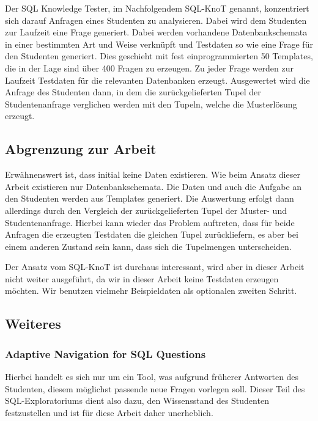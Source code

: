 Der SQL Knowledge Tester, im Nachfolgendem SQL-KnoT genannt, konzentriert sich darauf Anfragen eines Studenten zu analysieren. Dabei wird dem Studenten zur Laufzeit eine Frage generiert. Dabei werden vorhandene Datenbankschemata in einer bestimmten Art und Weise verknüpft und Testdaten so wie eine Frage für den Studenten generiert. Dies geschieht mit fest einprogrammierten 50 Templates, die in der Lage sind über 400 Fragen zu erzeugen. Zu jeder Frage werden zur Laufzeit Testdaten für die relevanten Datenbanken erzeugt. Ausgewertet wird die Anfrage des Studenten dann, in dem die zurückgelieferten Tupel der Studentenanfrage verglichen werden mit den Tupeln, welche die Musterlösung erzeugt. 

\subsection*{Abgrenzung zur Arbeit}

Erwähnenswert ist, dass initial keine Daten existieren. Wie beim Ansatz dieser Arbeit existieren nur Datenbankschemata. Die Daten und auch die Aufgabe an den Studenten werden aus Templates generiert. Die Auswertung erfolgt dann allerdings durch den Vergleich der zurückgelieferten Tupel der Muster- und Studentenanfrage. Hierbei kann wieder das Problem auftreten, dass für beide Anfragen die erzeugten Testdaten die gleichen Tupel zurückliefern, es aber bei einem anderen Zustand sein kann, dass sich die Tupelmengen unterscheiden. 

Der Ansatz vom SQL-KnoT ist durchaus interessant, wird aber in dieser Arbeit nicht weiter ausgeführt, da wir in dieser Arbeit keine Testdaten erzeugen möchten. Wir benutzen vielmehr Beispieldaten als optionalen zweiten Schritt.

\subsection{Weiteres}

\subsubsection{Adaptive Navigation for SQL Questions}

Hierbei handelt es sich nur um ein Tool, was aufgrund früherer Antworten des Studenten, diesem möglichst passende neue Fragen vorlegen soll. Dieser Teil des SQL-Exploratoriums dient also dazu, den Wissensstand des Studenten festzustellen und ist für diese Arbeit daher unerheblich.

